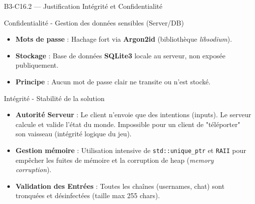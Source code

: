 \documentclass[aspectratio=169,10pt]{beamer}
\begin{document}
\begin{frame}{B3-C16.2 — Justification Intégrité et Confidentialité}
  \footnotesize
  
  \begin{block}{Confidentialité - Gestion des données sensibles (Server/DB)}
    \begin{itemize}
      \item \textbf{Mots de passe} : Hachage fort via \textbf{Argon2id} (bibliothèque \textit{libsodium}).
      \item \textbf{Stockage} : Base de données \textbf{SQLite3} locale au serveur, non exposée publiquement.
      \item \textbf{Principe} : Aucun mot de passe clair ne transite ou n'est stocké.
    \end{itemize}
  \end{block}
  
  \vspace{0.5em}
  \begin{block}{Intégrité - Stabilité de la solution}
    \begin{itemize}
      \item \textbf{Autorité Serveur} : Le client n'envoie que des intentions (inputs). Le serveur calcule et valide l'état du monde. Impossible pour un client de "téléporter" son vaisseau (intégrité logique du jeu).
      \item \textbf{Gestion mémoire} : Utilisation intensive de \texttt{std::unique\_ptr} et \texttt{RAII} pour empêcher les fuites de mémoire et la corruption de heap (\textit{memory corruption}).
      \item \textbf{Validation des Entrées} : Toutes les chaînes (usernames, chat) sont tronquées et désinfectées (taille max 255 chars).
    \end{itemize}
  \end{block}
\end{frame}
\end{document}
